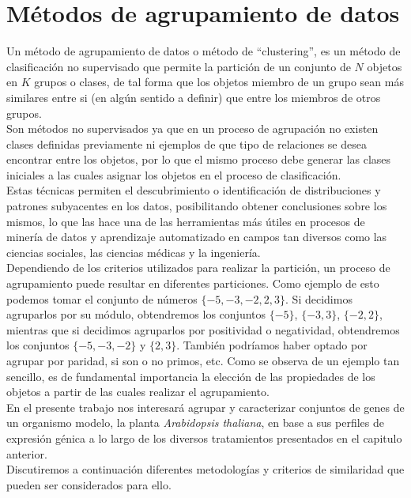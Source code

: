 \chapter{Métodos de agrupamiento de datos}
Un método de agrupamiento de datos o método de ``clustering'', es un método de clasificación no supervisado que permite la partición de un conjunto de $N$ objetos en $K$ grupos o clases, de tal forma que los objetos miembro de un grupo sean más similares entre si (en algún sentido a definir) que entre los miembros de otros grupos.\\
Son métodos no supervisados ya que en un proceso de agrupación no existen clases definidas previamente ni ejemplos de que tipo de relaciones se desea encontrar entre los objetos, por lo que el mismo proceso debe generar las clases iniciales a las cuales asignar los objetos en el proceso de clasificación.\\
Estas técnicas permiten el descubrimiento o identificación de distribuciones y patrones subyacentes en los datos, posibilitando obtener conclusiones sobre los mismos, lo que las hace una de las herramientas más útiles en procesos de minería de datos y aprendizaje automatizado en campos tan diversos como las ciencias sociales, las ciencias médicas y la ingeniería.\\
Dependiendo de los criterios utilizados para realizar la partición, un proceso de agrupamiento puede resultar en diferentes particiones. Como ejemplo de esto podemos tomar el conjunto de números $\{-5, -3, -2, 2, 3\}$. Si decidimos agruparlos por su módulo, obtendremos los conjuntos $\{-5\}$, $\{-3, 3\}$, $\{-2, 2\}$, mientras que si decidimos agruparlos por positividad o negatividad, obtendremos los conjuntos $\{-5, -3, -2\}$ y $\{2, 3\}$. También podríamos haber optado por agrupar por paridad, si son o no primos, etc. Como se observa de un ejemplo tan sencillo, es de fundamental importancia la elección de las propiedades de los objetos a partir de las cuales realizar el agrupamiento.\\
En el presente trabajo nos interesará agrupar y caracterizar conjuntos de genes de un organismo modelo, la planta \textit{Arabidopsis thaliana}, en base a sus perfiles de expresión génica a lo largo de los diversos tratamientos presentados en el capitulo anterior.\cite{Gan2007, Halkidi2001, Domany1999}\\
Discutiremos a continuación diferentes metodologías y criterios de similaridad que pueden ser considerados para ello.
